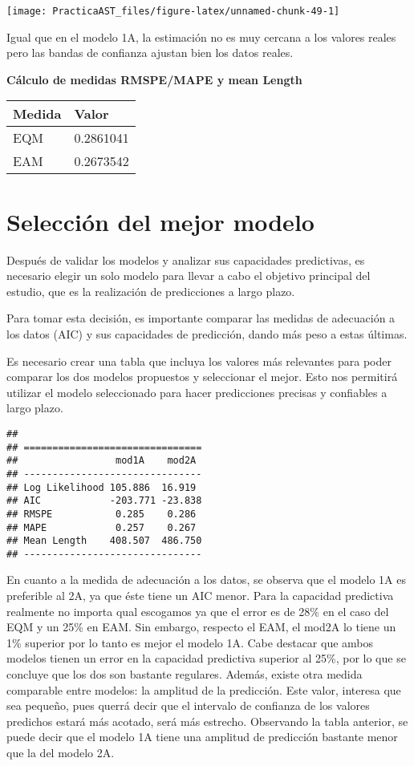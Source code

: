 \documentclass[
]{article}
\begin{document}
\begin{center}\texttt{[image: PracticaAST\_files/figure-latex/unnamed-chunk-49-1]} \end{center}

Igual que en el modelo 1A, la estimación no es muy cercana a los valores
reales pero las bandas de confianza ajustan bien los datos reales.

\pagebreak

\textbf{Cálculo de medidas RMSPE/MAPE y mean Length}

\begin{longtable}[]{@{}ll@{}}
\toprule()
Medida & Valor \\
\midrule()
\endhead
EQM & 0.2861041 \\
EAM & 0.2673542 \\
\bottomrule()
\end{longtable}

\hypertarget{selecciuxf3n-del-mejor-modelo}{%
\section{Selección del mejor
modelo}\label{selecciuxf3n-del-mejor-modelo}}

Después de validar los modelos y analizar sus capacidades predictivas,
es necesario elegir un solo modelo para llevar a cabo el objetivo
principal del estudio, que es la realización de predicciones a largo
plazo.

Para tomar esta decisión, es importante comparar las medidas de
adecuación a los datos (AIC) y sus capacidades de predicción, dando más
peso a estas últimas.

Es necesario crear una tabla que incluya los valores más relevantes para
poder comparar los dos modelos propuestos y seleccionar el mejor. Esto
nos permitirá utilizar el modelo seleccionado para hacer predicciones
precisas y confiables a largo plazo.

\begin{verbatim}
## 
## ===============================
##                 mod1A    mod2A 
## -------------------------------
## Log Likelihood 105.886  16.919 
## AIC            -203.771 -23.838
## RMSPE           0.285    0.286 
## MAPE            0.257    0.267 
## Mean Length    408.507  486.750
## -------------------------------
\end{verbatim}

En cuanto a la medida de adecuación a los datos, se observa que el
modelo 1A es preferible al 2A, ya que éste tiene un AIC menor. Para la
capacidad predictiva realmente no importa qual escogamos ya que el error
es de 28\% en el caso del EQM y un 25\% en EAM. Sin embargo, respecto el
EAM, el mod2A lo tiene un 1\% superior por lo tanto es mejor el modelo
1A. Cabe destacar que ambos modelos tienen un error en la capacidad
predictiva superior al 25\%, por lo que se concluye que los dos son
bastante regulares. Además, existe otra medida comparable entre modelos:
la amplitud de la predicción. Este valor, interesa que sea pequeño, pues
querrá decir que el intervalo de confianza de los valores predichos
estará más acotado, será más estrecho. Observando la tabla anterior, se
puede decir que el modelo 1A tiene una amplitud de predicción bastante
menor que la del modelo 2A.
\end{document}
